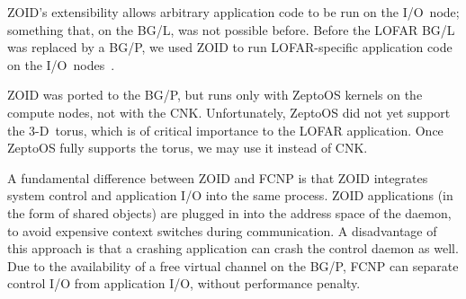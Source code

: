 \documentclass[journal]{IEEEtran}
\begin{document}
ZOID's extensibility allows arbitrary application code to be run on the
I/O~node; something that, on the BG/L, was not possible before.
Before the LOFAR BG/L was replaced by a BG/P, we used ZOID to run LOFAR-specific
application code on the I/O~nodes~\cite{Iskra:08}.


ZOID was ported to the BG/P, but runs only with ZeptoOS kernels on the
compute nodes, not with the CNK.
Unfortunately, ZeptoOS did not yet support the 3-D~torus, which is of critical
importance to the LOFAR application.
Once ZeptoOS fully supports the torus, we may use it instead of CNK.

A fundamental difference between ZOID and FCNP is that ZOID integrates system
control and application I/O into the same process.
ZOID applications (in the form of shared objects) are plugged in into the
address space of the daemon, to avoid expensive context switches during
communication.
A disadvantage of this approach is that a crashing application can crash
the control daemon as well.
Due to the availability of a free virtual channel on the BG/P,
FCNP can separate control I/O from application I/O, without performance penalty.

\end{document}
